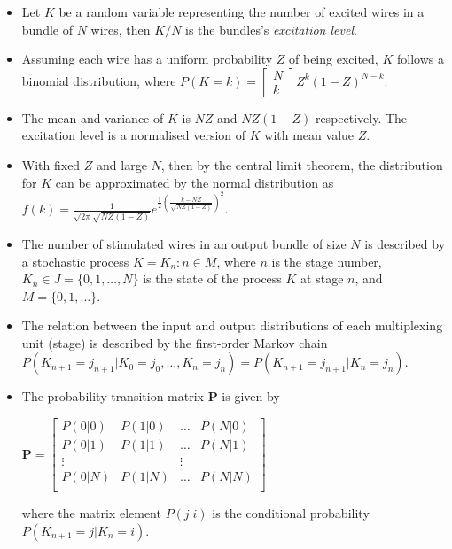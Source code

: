 \begin{itemize}
    \item Let $K$ be a random variable representing the number of excited wires in a bundle of $N$ wires, then $K/N$ is the bundles's 
    \emph{excitation level}.
    
    \item Assuming each wire has a uniform probability $Z$ of being excited, $K$ follows a binomial distribution, where 
    $P(K = k) = \begin{bmatrix} N \\ k \end{bmatrix} Z^k (1 - Z)^{N - k}$.

    \item The mean and variance of $K$ is $NZ$ and $NZ(1 - Z)$ respectively. The excitation level is a normalised version of $K$ with 
    mean value $Z$.

    \item With fixed $Z$ and large $N$, then by the central limit theorem, the distribution for $K$ can be approximated by the normal 
    distribution as $f(k) = \frac{1}{\sqrt{2\pi}\sqrt{NZ(1-Z)}}e^{\frac{1}{2} \left(\frac{k - NZ}{\sqrt{NZ(1-Z)}}\right)^2}$.

    \item The number of stimulated wires in an output bundle of size $N$ is described by a stochastic process $K = {K_n : n \in M}$, where 
    $n$ is the stage number, $K_n \in J = \{0, 1, \ldots, N\}$ is the state of the process $K$ at stage $n$, and $M = \{0, 1,\ldots\}$.
    
    \item The relation between the input and output distributions of each multiplexing unit (stage) is described by the first-order Markov 
    chain $P(K_{n+1} = j_{n+1} | K_0 = j_0, \ldots, K_n = j_n) = P(K_{n+1} = j_{n+1} | K_n = j_n)$.

    \item The probability transition matrix $\textbf{P}$ is given by
    \begin{center}
        $ \textbf{P} = \begin{bmatrix}
            P(0|0) & P(1|0) & \ldots & P(N|0) \\
            P(0|1) & P(1|1) & \ldots & P(N|1) \\
            \vdots &        & \vdots &        \\
            P(0|N) & P(1|N) & \ldots & P(N|N) \\
        \end{bmatrix} $ \\
    \end{center}
    \noindent where the matrix element $P(j|i)$ is the conditional probability $P(K_{n+1} = j | K_n = i)$.


\end{itemize}
